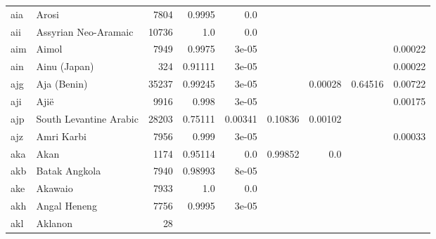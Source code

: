 \documentclass[11pt]{article}
\begin{document}
\begin{table*}[ht]
{\begin{tabular}{llrrrrrrr}
aia         & Arosi         & 7804         & 0.9995         & 0.0         &          &          &          &          \\

aii         & Assyrian Neo-Aramaic         & 10736         & 1.0         & 0.0         &          &          &          &          \\

aim         & Aimol         & 7949         & 0.9975         & 3e-05         &          &          &          & 0.00022         \\

ain         & Ainu (Japan)         & 324         & 0.91111         & 3e-05         &          &          &          & 0.00022         \\

ajg         & Aja (Benin)         & 35237         & 0.99245         & 3e-05         &          & 0.00028         & 0.64516         & 0.00722         \\

aji         & Ajië         & 9916         & 0.998         & 3e-05         &          &          &          & 0.00175         \\

ajp         & South Levantine Arabic         & 28203         & 0.75111         & 0.00341         & 0.10836         & 0.00102         &          &          \\

ajz         & Amri Karbi         & 7956         & 0.999         & 3e-05         &          &          &          & 0.00033         \\

aka         & Akan         & 1174         & 0.95114         & 0.0         & 0.99852         & 0.0         &          &          \\

akb         & Batak Angkola         & 7940         & 0.98993         & 8e-05         &          &          &          &          \\

ake         & Akawaio         & 7933         & 1.0         & 0.0         &          &          &          &          \\

akh         & Angal Heneng         & 7756         & 0.9995         & 3e-05         &          &          &          &          \\

akl         & Aklanon         & 28         &          &          &          &          &          &          \\


\end{tabular}}
\end{table*}
\end{document}
